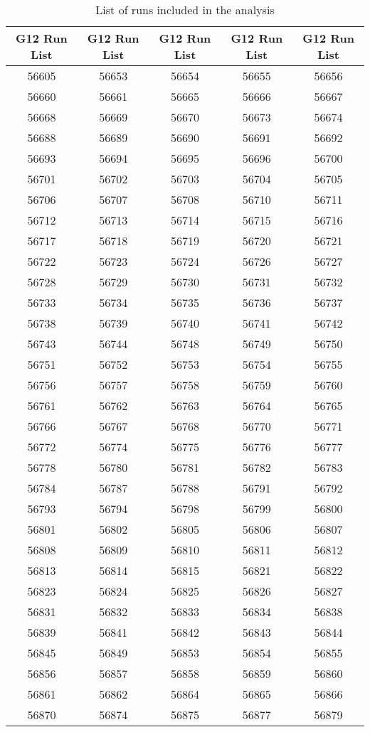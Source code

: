 \begin{longtable}{|c|c|c|c|c|}
\caption{List of runs included in the analysis}\\
\hline
G12 Run List &G12 Run List & G12 Run List & G12 Run List & G12 Run List \\
\hline
56605&56653&56654&56655&56656\\ 
56660&56661&56665&56666&56667\\ 
56668&56669&56670&56673&56674\\ 
56688&56689&56690&56691&56692\\ 
56693&56694&56695&56696&56700\\ 
56701&56702&56703&56704&56705\\ 
56706&56707&56708&56710&56711\\ 
56712&56713&56714&56715&56716\\ 
56717&56718&56719&56720&56721\\ 
56722&56723&56724&56726&56727\\ 
56728&56729&56730&56731&56732\\ 
56733&56734&56735&56736&56737\\ 
56738&56739&56740&56741&56742\\ 
56743&56744&56748&56749&56750\\ 
56751&56752&56753&56754&56755\\ 
56756&56757&56758&56759&56760\\ 
56761&56762&56763&56764&56765\\ 
56766&56767&56768&56770&56771\\ 
56772&56774&56775&56776&56777\\ 
56778&56780&56781&56782&56783\\ 
56784&56787&56788&56791&56792\\ 
56793&56794&56798&56799&56800\\ 
56801&56802&56805&56806&56807\\ 
56808&56809&56810&56811&56812\\ 
56813&56814&56815&56821&56822\\ 
56823&56824&56825&56826&56827\\ 
56831&56832&56833&56834&56838\\ 
56839&56841&56842&56843&56844\\ 
56845&56849&56853&56854&56855\\ 
56856&56857&56858&56859&56860\\ 
56861&56862&56864&56865&56866\\ 
56870&56874&56875&56877&56879\\ 

\end{longtable}
